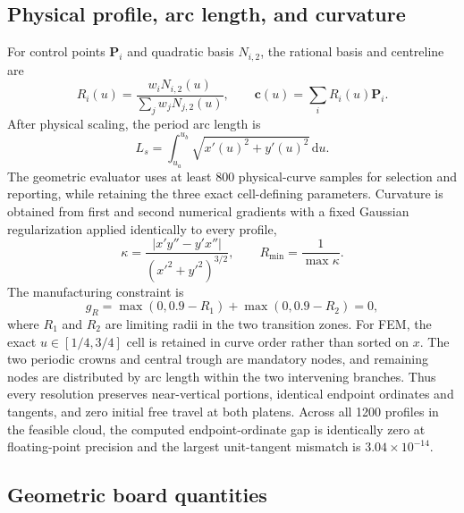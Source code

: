 \documentclass[11pt]{article}
\newcommand{\Rmin}{R_{\min}}
\begin{document}
\subsection{Physical profile, arc length, and curvature}

For control points $\bm P_i$ and quadratic basis $N_{i,2}$, the rational basis and centreline are
\begin{equation}
R_i(u)=\frac{w_iN_{i,2}(u)}{\sum_jw_jN_{j,2}(u)},\qquad
\bm c(u)=\sum_iR_i(u)\bm P_i.
\label{eq:nurbs}
\end{equation}
After physical scaling, the period arc length is
\begin{equation}
L_s=\int_{u_a}^{u_b}\sqrt{x'(u)^2+y'(u)^2}\,\mathrm du.
\label{eq:arc}
\end{equation}
The geometric evaluator uses at least 800 physical-curve samples for selection and reporting, while retaining the three exact cell-defining parameters. Curvature is obtained from first and second numerical gradients with a fixed Gaussian regularization applied identically to every profile,
\begin{equation}
\kappa=\frac{|x'y''-y'x''|}{(x'^2+y'^2)^{3/2}},\qquad
\Rmin=\frac{1}{\max\kappa}.
\label{eq:curvature}
\end{equation}
The manufacturing constraint is
\begin{equation}
g_R=\max(0,0.9-R_1)+\max(0,0.9-R_2)=0,
\label{eq:radius_constraint}
\end{equation}
where $R_1$ and $R_2$ are limiting radii in the two transition zones. For FEM, the exact $u\in[1/4,3/4]$ cell is retained in curve order rather than sorted on $x$. The two periodic crowns and central trough are mandatory nodes, and remaining nodes are distributed by arc length within the two intervening branches. Thus every resolution preserves near-vertical portions, identical endpoint ordinates and tangents, and zero initial free travel at both platens. Across all 1200 profiles in the feasible cloud, the computed endpoint-ordinate gap is identically zero at floating-point precision and the largest unit-tangent mismatch is $3.04\times10^{-14}$.



\subsection{Geometric board quantities}
\end{document}
